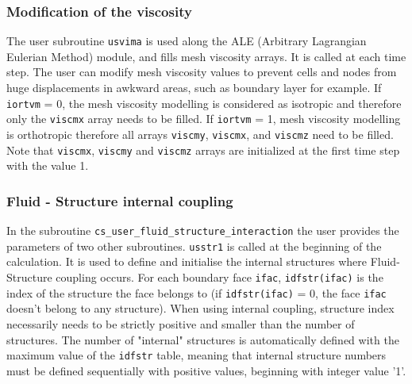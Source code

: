 {%
\subsubsection{Modification of the viscosity}

The user subroutine \texttt{usvima} is used along the ALE (Arbitrary Lagrangian Eulerian
 Method) module, and fills mesh viscosity arrays. It is called at each time step.
The user can modify mesh viscosity values to prevent cells and nodes from huge
 displacements in awkward areas, such as boundary layer for example.
If \texttt{iortvm} = 0, the mesh viscosity modelling is considered as isotropic and
 therefore only the \texttt{viscmx} array needs to be filled.
If \texttt{iortvm} = 1, mesh viscosity modelling is orthotropic therefore all arrays
 \texttt{viscmy}, \texttt{viscmx}, and \texttt{viscmz} need to be filled.
Note that \texttt{viscmx}, \texttt{viscmy} and \texttt{viscmz} arrays are initialized
 at the first time step with the value 1.

\subsubsection{Fluid - Structure internal coupling}\label{sec:ALE}

In the subroutine \texttt{cs\_user\_fluid\_structure\_interaction} the user provides the parameters of two other subroutines.
\texttt{usstr1} is called at the beginning of the calculation. It is used to define
 and initialise the internal structures where Fluid-Structure coupling occurs.
For each boundary face \texttt{ifac}, \texttt{idfstr(ifac)} is the index of the structure
 the face belongs to (if \texttt{idfstr(ifac)} = 0, the face \texttt{ifac} doesn't belong
 to any structure). When using internal coupling, structure index necessarily needs to be
 strictly positive and smaller than the number of structures. The number of "internal" structures is automatically defined with the maximum
 value of the \texttt{idfstr} table, meaning that internal structure numbers must be defined
 sequentially with positive values, beginning with integer value '1'.

}
